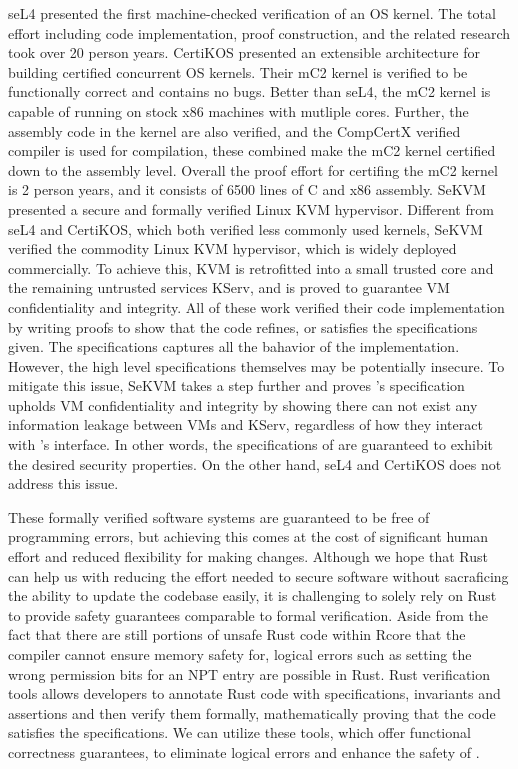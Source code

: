 seL4 \cite{sel4} presented the first machine-checked verification of an OS
kernel. The total effort including code implementation, proof construction,
and the related research took over 20 person years.
CertiKOS \cite{certikos} presented an extensible architecture for building
certified concurrent OS kernels. Their mC2 kernel is verified to be
functionally correct and contains no bugs. Better than seL4, the mC2 kernel
is capable of running on stock x86 machines with mutliple cores. Further,
the assembly code in the kernel are also verified, and the CompCertX verified
compiler is used for compilation, these combined make the mC2 kernel certified
down to the assembly level. Overall the proof effort for certifing the mC2
kernel is 2 person years, and it consists of 6500 lines of C and x86 assembly.
SeKVM \cite{sekvm} presented a secure and formally verified Linux KVM
hypervisor. Different from seL4 and CertiKOS, which both verified less commonly
used kernels, SeKVM verified the commodity Linux KVM hypervisor, which is
widely deployed commercially. To achieve this, KVM is retrofitted into a small
trusted core \secore{} and the remaining untrusted services KServ, and
\secore{} is proved to guarantee VM confidentiality and integrity.
All of these work verified their code implementation by writing proofs to show
that the code refines, or satisfies the specifications given. The
specifications captures all the bahavior of the implementation.
However, the high level specifications themselves may be potentially insecure.
To mitigate this issue, SeKVM takes a step further and proves \secore{}'s
specification upholds VM confidentiality and integrity by showing there can not
exist any information leakage between VMs and KServ, regardless of how they
interact with \secore{}'s interface. In other words, the specifications of
\secore{} are guaranteed to exhibit the desired security properties. On the
other hand, seL4 and CertiKOS does not address this issue.

These formally verified software systems are guaranteed to be free of
programming errors, but achieving this comes at the cost of significant human
effort and reduced flexibility for making changes.
Although we hope that Rust can help us with reducing the effort needed to secure
software without sacraficing the ability to update the codebase easily,
it is challenging to solely rely on Rust to provide safety guarantees
comparable to formal verification.
Aside from the fact that there are still portions of unsafe Rust code within
Rcore that the compiler cannot ensure memory safety for,
logical errors such as setting the wrong permission bits for an NPT entry are
possible in Rust.
Rust verification tools \cite{Verus, Prusti, Creusot, Flux, aeneas} allows developers
to annotate Rust code with specifications, invariants and assertions and then
verify them formally, mathematically proving that the code satisfies the
specifications. We can utilize these tools, which offer functional correctness
guarantees, to eliminate logical errors and enhance the safety of \rustcore{}.

